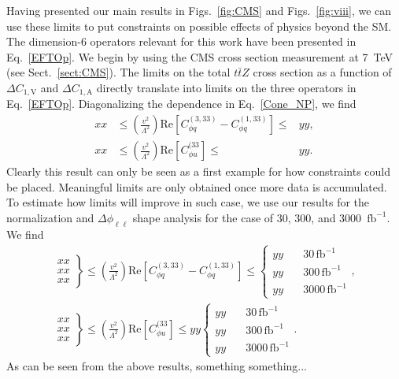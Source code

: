 \documentclass[preprint]{JHEP3} %
\def\ttbZ{t\bar{t}Z}
\def\invfb {\mathrm{fb}^{-1}}
\def\DConeA{\Delta C_{1,\mathrm{A}}}
\def\DConeV{\Delta C_{1,\mathrm{V}}}
\newcommand{\be}{\begin{eqnarray}}
\newcommand{\ee}{\end{eqnarray}}
\begin{document}
Having presented our main results in Figs.~\ref{fig:CMS} and Figs.~\ref{fig:viii}, we can use these limits to put constraints on 
possible effects of physics beyond the SM. 
The dimension-6 operators relevant for this work have been presented in Eq.~\ref{EFTOp}.
We begin by using the CMS cross section measurement at 7~TeV (see Sect.~\ref{sect:CMS}). 
The limits on the total $\ttbZ$ cross section as a function of $\DConeV$ and $\DConeA$ directly
translate into limits on the three operators in Eq.~\ref{EFTOp}. 
Diagonalizing the dependence in Eq.~\ref{Cone_NP}, we find
\be
 xx &\le \left(\frac{v^2}{\Lambda^2} \right) \mathrm{Re} \left[ C^{(3,33)}_{\phi q} - C^{(1,33)}_{\phi q}  \right]   \le & yy ,
  \\
 xx&\le  \left(\frac{v^2}{\Lambda^2} \right) \mathrm{Re} \left[ C^{(33}_{\phi u} \right]  \le &yy .
\ee
Clearly this result can only be seen as a first example for how constraints could be placed.
Meaningful limits are only obtained once more data is accumulated.
To estimate how limits will improve in such case, we use our results for the normalization and $\Delta \phi_{\ell\ell}$ shape 
analysis for the case of 30, 300, and 3000~$\invfb$.
We find
\be
 \left. \begin{array}{l}
 xx \\
 xx \\
 xx  
 \end{array} \right\}
 \le \left(\frac{v^2}{\Lambda^2} \right) \mathrm{Re} \left[ C^{(3,33)}_{\phi q} - C^{(1,33)}_{\phi q}  \right]  \le  
 \left\{ \begin{array}{ll}
 yy & \quad 30  \, \invfb \\
 yy & \quad 300 \, \invfb \\
 yy & \quad 3000\, \invfb  
 \end{array} \right.
 ,\\
 \left. \begin{array}{l}
 xx \\
 xx \\
 xx  
 \end{array} \right\}
 \le  \left(\frac{v^2}{\Lambda^2} \right) \mathrm{Re} \left[ C^{(33}_{\phi u} \right]  \le yy
 \left\{ \begin{array}{ll}
 yy & \quad 30  \, \invfb \\
 yy & \quad 300 \, \invfb \\
 yy & \quad 3000\, \invfb  
 \end{array} \right. .
\ee
As can be seen from the above results, something something...
\end{document}

